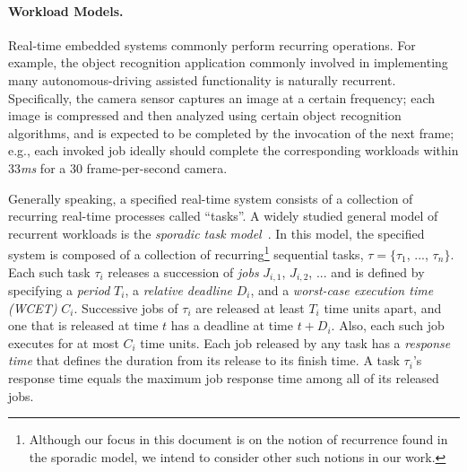 \paragraph{Workload Models.} Real-time embedded systems commonly perform recurring operations. For example, the object recognition application commonly involved in implementing many autonomous-driving assisted functionality is naturally recurrent. Specifically, the camera sensor captures an image at a certain frequency; each image is compressed and then analyzed using certain object recognition algorithms, and is expected to be completed by the invocation of the next frame; e.g., each invoked job ideally should complete the corresponding workloads within 33\textit{ms} for a 30 frame-per-second camera. %

Generally speaking, a specified real-time system consists of a collection of recurring real-time processes called ``tasks''. %
A widely studied general model of recurrent workloads is the \textit{sporadic task model}~\cite{sporadic}. In this model, the specified system is composed of a collection of recurring\footnote{Although our focus in this document is on the notion of recurrence found in the sporadic model, we intend to consider other such notions in our work.} %
sequential tasks, $\tau = \lbrace \tau_1$, ..., $\tau_n \rbrace$. Each such task $\tau_i$ releases a succession of \textit{jobs} $J_{i,1}$, $J_{i,2}$, ... and is defined by specifying a \textit{period} $T_i$, a \textit{relative deadline} $D_i$, and a \textit{worst-case execution time (WCET)} $C_i$. Successive jobs of $\tau_i$ are released at least $T_i$ time units apart, and one that is released at time $t$ has a deadline at time $t+D_i$. Also, each such job executes for at most $C_i$ time units. %
Each job released by any task has a \textit{response time} that defines the duration from its release to its finish time. A task $\tau_i$'s response time equals the maximum job response time among all of its released jobs. 

